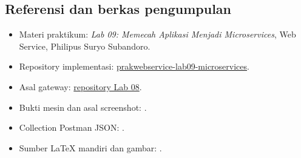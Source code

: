\documentclass[11pt,a4paper]{article}
\newcommand{\repo}{\href{https://github.com/academicbambang/prakwebservice-lab09-microservices}{prakwebservice-lab09-microservices}}
\begin{document}
\subsection{Referensi dan berkas pengumpulan}
\begin{itemize}
\item Materi praktikum: \textit{Lab 09: Memecah Aplikasi Menjadi Microservices},
Web Service, Philipus Suryo Subandoro.
\item Repository implementasi: \repo.
\item Asal gateway: \href{https://github.com/academicbambang/prakwebservice-lab08-api-gateway}{repository Lab 08}.
\item Bukti mesin dan asal screenshot: .
\item Collection Postman JSON: .
\item Sumber LaTeX mandiri dan gambar: .
\end{itemize}
\end{document}
